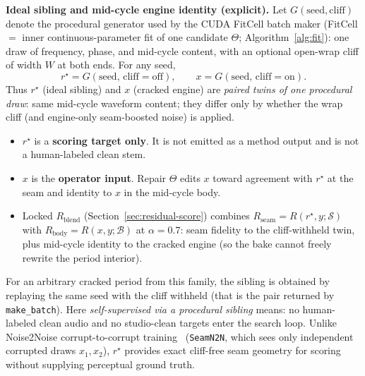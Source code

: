 \textbf{Ideal sibling and mid-cycle engine identity (explicit).}
Let $G(\mathrm{seed},\mathrm{cliff})$ denote the procedural generator used by the CUDA FitCell batch maker
(FitCell $=$ inner continuous-parameter fit of one candidate $\Theta$; Algorithm~\ref{alg:fit}):
one draw of frequency, phase, and mid-cycle content, with an optional open-wrap cliff of width $W$ at both ends.
For any seed,
\begin{equation}
\label{eq:G-siblings}
r^{\star}=G(\mathrm{seed},\,\mathrm{cliff{=}off}),\qquad
x=G(\mathrm{seed},\,\mathrm{cliff{=}on}).
\end{equation}
Thus $r^{\star}$ (ideal sibling) and $x$ (cracked engine) are \emph{paired twins of one procedural draw}:
same mid-cycle waveform content; they differ only by whether the wrap cliff (and engine-only seam-boosted noise) is applied.
\begin{itemize}
  \item $r^{\star}$ is a \textbf{scoring target only}. It is not emitted as a method output and is not a human-labeled clean stem.
  \item $x$ is the \textbf{operator input}. Repair $\Theta$ edits $x$ toward agreement with $r^{\star}$ at the seam and identity to $x$ in the mid-cycle body.
  \item Locked $R_{\mathrm{blend}}$ (Section~\ref{sec:residual-score}) combines $R_{\mathrm{seam}}=R(r^{\star},y;\mathcal{S})$ with $R_{\mathrm{body}}=R(x,y;\mathcal{B})$ at $\alpha{=}0.7$:
    seam fidelity to the cliff-withheld twin, plus mid-cycle identity to the cracked engine (so the bake cannot freely rewrite the period interior).
\end{itemize}
For an arbitrary cracked period from this family, the sibling is obtained by replaying the same seed with the cliff withheld
(that is the pair returned by \texttt{make\_batch}).
Here \emph{self-supervised via a procedural sibling} means: no human-labeled clean audio and no studio-clean targets enter the search loop.
Unlike Noise2Noise corrupt-to-corrupt training~\cite{lehtinen2018,kashyap2021n2n} (\texttt{SeamN2N}, which sees only independent corrupted draws $x_1,x_2$), $r^{\star}$ provides exact cliff-free seam geometry for scoring without supplying perceptual ground truth.

